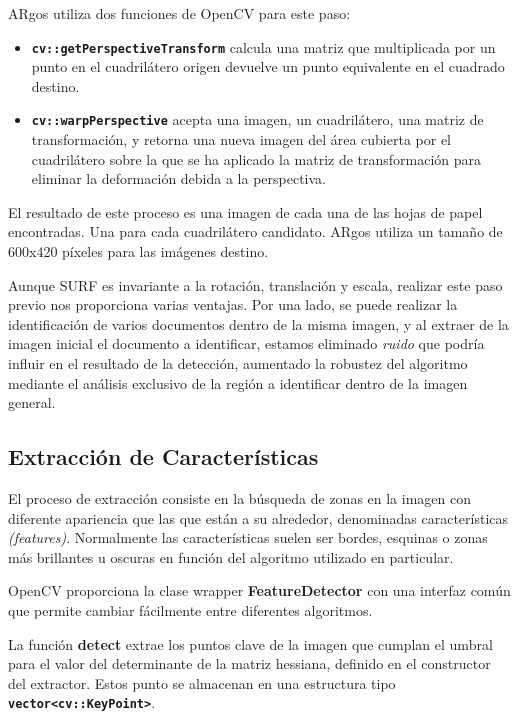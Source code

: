 ARgos utiliza dos funciones de OpenCV para este paso:

\begin{itemize}
\item \textbf{\texttt{cv::getPerspectiveTransform}} calcula
  una matriz que multiplicada por un punto en el cuadrilátero origen
  devuelve un punto equivalente en el cuadrado destino.

\item \textbf{\texttt{cv::warpPerspective}} acepta una
  imagen, un cuadrilátero, una matriz de transformación, y retorna una
  nueva imagen del área cubierta por el cuadrilátero sobre la que se
  ha aplicado la matriz de transformación para eliminar la deformación
  debida a la perspectiva.
\end{itemize}

El resultado de este proceso es una imagen de cada una de las hojas de
papel encontradas. Una para cada cuadrilátero candidato. ARgos utiliza
un tamaño de 600x420 píxeles para las imágenes destino.

Aunque SURF es invariante a la rotación, translación y
escala, realizar este paso previo nos proporciona varias ventajas. Por
una lado, se puede realizar la identificación de varios documentos
dentro de la misma imagen, y al extraer de la imagen inicial el
documento a identificar, estamos eliminado \emph{ruido} que podría
influir en el resultado de la detección, aumentado la robustez del algoritmo mediante
el análisis exclusivo de la región a identificar dentro de la imagen
general.

\subsection{Extracción de Características}

El proceso de extracción consiste en la búsqueda de zonas en la imagen
con diferente apariencia que las que están a su alrededor, denominadas características \textit{(features)}. Normalmente las características suelen ser bordes, esquinas o zonas más brillantes u oscuras en
función del algoritmo utilizado en particular.

OpenCV proporciona la clase wrapper \textbf{FeatureDetector} con una interfaz común que permite
cambiar fácilmente entre diferentes algoritmos.


La función \textbf{detect} extrae los puntos clave de la imagen que
cumplan el umbral para el valor del determinante de la matriz
hessiana, definido en el constructor del extractor. Estos punto se
almacenan en una estructura tipo \textbf{\texttt{vector<cv::KeyPoint>}}.


